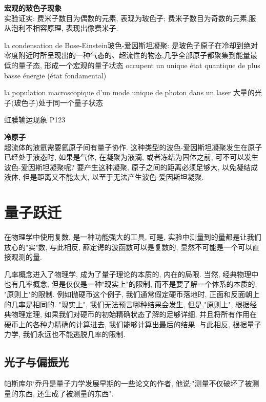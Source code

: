 \textbf{宏观的玻色子现象}\\
实验证实: 费米子数目为偶数的元素, 表现为玻色子; 费米子数目为奇数的元素,服从泡利不相容原理, 表现出像费米子.

la condensation de Bose-Einstein玻色-爱因斯坦凝聚: 是玻色子原子在冷却到绝对零度附近时所呈现出的一种气态的、超流性的物态,几乎全部原子都聚集到能量最低的量子态,
形成一个宏观的量子状态  occupent un unique \'etat quantique de plus basse \'energie (\'etat fondamental)

la population macroscopique d'un mode unique de photon dans un laser
大量的光子(玻色子)处于同一个量子状态

虹膜输运现象 P123

\textbf{冷原子}\\
超流体的液氦需要氦原子间有量子协作. 这种类型的波色-爱因斯坦凝聚发生在原子已经处于液态时, 如果是气体, 在凝聚为液滴, 或者冻结为固体之前,
可不可以发生波色-爱因斯坦凝聚呢? 要产生这种凝聚, 原子之间的距离必须足够大, 以免凝结成液体, 但是距离又不能太大, 以至于无法产生波色-爱因斯坦凝聚.

\section{量子跃迁}
在物理学中使用复数, 是一种功能强大的工具, 可是, 实验中测量到的量都是让我们放心的"实"数, 与此相反, 薛定谔的波函数可以是复数的, 显然不可能是一个可以直接观测的量.

几率概念进入了物理学, 成为了量子理论的本质的, 内在的局限. 当然, 经典物理中也有几率概念, 但是仅仅是一种"现实上"的限制, 而不是要了解一个体系的本质的, "原则上"的限制.
例如抛硬币这个例子, 我们通常假定硬币落地时, 正面和反面朝上的几率是相同的. "现实上", 我们无法预言哪种结果会发生,
但是,"原则上", 根据经典物理定理, 如果我们对硬币的初始精确状态了解的足够详细, 并且将所有作用在硬币上的各种力精确的计算进去, 我们能够计算出最后的结果.
与此相反, 根据量子力学, 我们永远也不能逃脱几率的限制.

\subsection{光子与偏振光}
帕斯库尔`乔丹是量子力学发展早期的一些论文的作者, 他说:"测量不仅破坏了被测量的东西, 还生成了被测量的东西".

